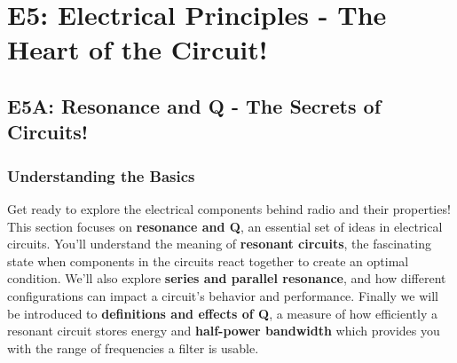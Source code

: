 
\chapter{E5: Electrical Principles - The Heart of the Circuit!}

\section{E5A: Resonance and Q - The Secrets of Circuits!}

\subsection*{Understanding the Basics}
Get ready to explore the electrical components behind radio and their properties! This section focuses on \textcolor{myblue}{\textbf{resonance and Q}}, an essential set of ideas in electrical circuits. You'll understand the meaning of \textcolor{myblue}{\textbf{resonant circuits}}, the fascinating state when components in the circuits react together to create an optimal condition. We'll also explore  \textcolor{myblue}{\textbf{series and parallel resonance}}, and how different configurations can impact a circuit's behavior and performance. Finally we will be introduced to  \textcolor{myblue}{\textbf{definitions and effects of Q}}, a measure of how efficiently a resonant circuit stores energy and  \textcolor{myblue}{\textbf{half-power bandwidth}} which provides you with the range of frequencies a filter is usable.


